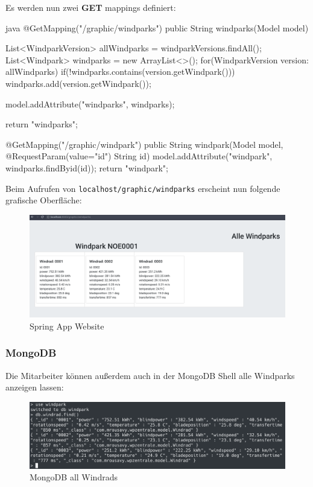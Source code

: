 Es werden nun zwei \textbf{GET} mappings definiert:

\begin{code}{java}
    @GetMapping("/graphic/windparks")
    public String windparks(Model model){
        List<WindparkVersion> allWindparks = windparkVersions.findAll();
        List<Windpark> windparks = new ArrayList<>();
        for(WindparkVersion version: allWindparks){
            if(!windparks.contains(version.getWindpark())){
                windparks.add(version.getWindpark());
            }
        }

        model.addAttribute("windparks", windparks);

        return "windparks";
    }

    @GetMapping("/graphic/windpark")
    public String windpark(Model model, @RequestParam(value="id") String id){
        model.addAttribute("windpark", windparks.findByid(id));
        return "windpark";
    }
\end{code}

Beim Aufrufen von \texttt{localhost/graphic/windparks} erscheint nun folgende grafische Oberfläche:

\begin{figure}
    \caption{Spring App Website}
    \includegraphics[width=15cm]{images/spring-app-gui}
    \centering
\end{figure}





\clearpage
\subsubsection{MongoDB}

Die Mitarbeiter können außerdem auch in der MongoDB Shell alle Windparks anzeigen lassen:

\begin{figure}
    \caption{MongoDB all Windrads}
    \includegraphics[width=15cm]{images/mongo-windrads}
    \centering
\end{figure}

